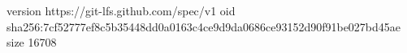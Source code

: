 version https://git-lfs.github.com/spec/v1
oid sha256:7cf52777ef8c5b35448dd0a0163c4ce9d9da0686ce93152d90f91be027bd45ae
size 16708

